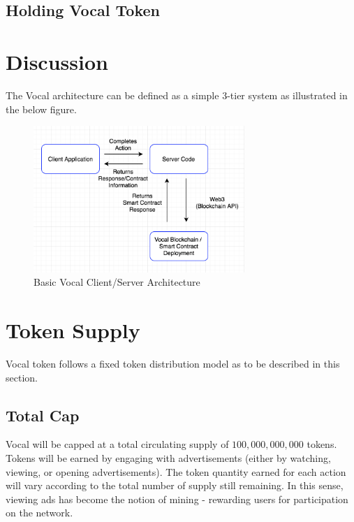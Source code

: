 \documentclass[conference]{IEEEtran}
\begin{document}
    \subsection{Holding Vocal Token}

    \section{Discussion}

    The Vocal architecture can be defined as a simple 3-tier system as illustrated in the below figure.

    \begin{figure}[t]
      \includegraphics[width=8cm]{assets/architecture.png}
      \caption{Basic Vocal Client/Server Architecture}
      \centering
    \end{figure}


    
    \section{Token Supply}

    Vocal token follows a fixed token distribution model as to be described in this section.

    \subsection{Total Cap}
    Vocal will be capped at a total circulating supply of $100,000,000,000$ tokens. Tokens will be earned by engaging with advertisements (either by watching, viewing, or opening advertisements).
     The token quantity earned for each action will vary according to the total number of supply still remaining. In this sense, viewing ads has become the notion of mining - rewarding users for participation on the network.
\end{document}
